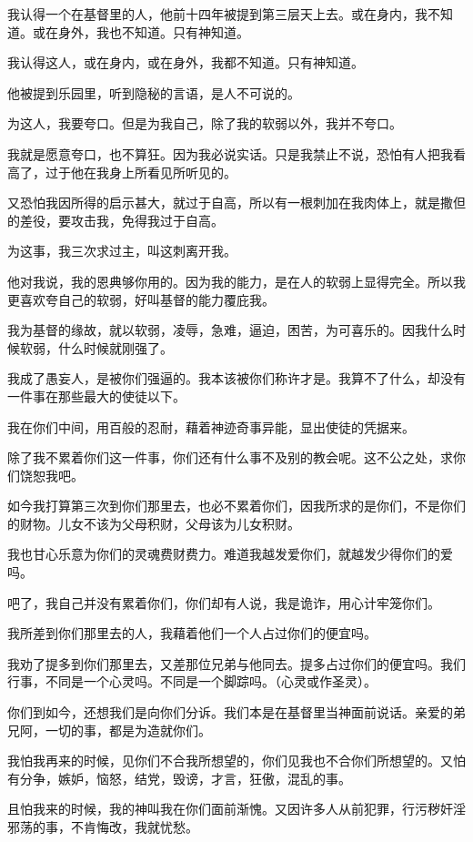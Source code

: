 \documentclass[12pt,oneside]{book}
\begin{document}
我认得一个在基督里的人，他前十四年被提到第三层天上去。或在身内，我不知道。或在身外，我也不知道。只有神知道。

我认得这人，或在身内，或在身外，我都不知道。只有神知道。

他被提到乐园里，听到隐秘的言语，是人不可说的。

为这人，我要夸口。但是为我自己，除了我的软弱以外，我并不夸口。

我就是愿意夸口，也不算狂。因为我必说实话。只是我禁止不说，恐怕有人把我看高了，过于他在我身上所看见所听见的。

又恐怕我因所得的启示甚大，就过于自高，所以有一根刺加在我肉体上，就是撒但的差役，要攻击我，免得我过于自高。

为这事，我三次求过主，叫这刺离开我。

他对我说，我的恩典够你用的。因为我的能力，是在人的软弱上显得完全。所以我更喜欢夸自己的软弱，好叫基督的能力覆庇我。

我为基督的缘故，就以软弱，凌辱，急难，逼迫，困苦，为可喜乐的。因我什么时候软弱，什么时候就刚强了。

我成了愚妄人，是被你们强逼的。我本该被你们称许才是。我算不了什么，却没有一件事在那些最大的使徒以下。

我在你们中间，用百般的忍耐，藉着神迹奇事异能，显出使徒的凭据来。

除了我不累着你们这一件事，你们还有什么事不及别的教会呢。这不公之处，求你们饶恕我吧。

如今我打算第三次到你们那里去，也必不累着你们，因我所求的是你们，不是你们的财物。儿女不该为父母积财，父母该为儿女积财。

我也甘心乐意为你们的灵魂费财费力。难道我越发爱你们，就越发少得你们的爱吗。

吧了，我自己并没有累着你们，你们却有人说，我是诡诈，用心计牢笼你们。

我所差到你们那里去的人，我藉着他们一个人占过你们的便宜吗。

我劝了提多到你们那里去，又差那位兄弟与他同去。提多占过你们的便宜吗。我们行事，不同是一个心灵吗。不同是一个脚踪吗。（心灵或作圣灵）。

你们到如今，还想我们是向你们分诉。我们本是在基督里当神面前说话。亲爱的弟兄阿，一切的事，都是为造就你们。

我怕我再来的时候，见你们不合我所想望的，你们见我也不合你们所想望的。又怕有分争，嫉妒，恼怒，结党，毁谤，才言，狂傲，混乱的事。

且怕我来的时候，我的神叫我在你们面前渐愧。又因许多人从前犯罪，行污秽奸淫邪荡的事，不肯悔改，我就忧愁。
\end{document}
